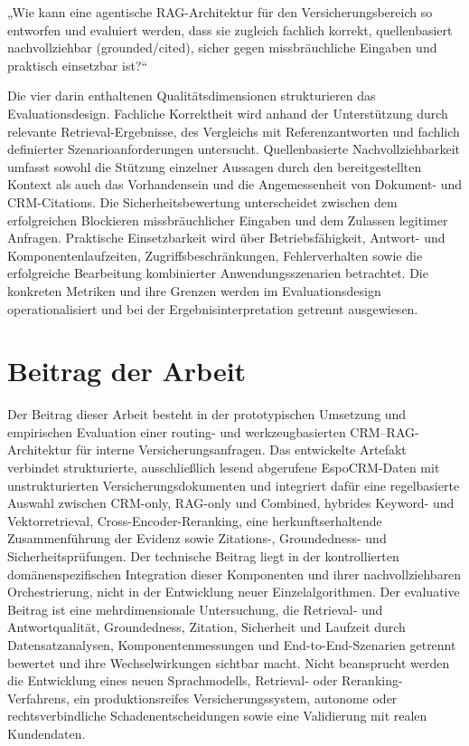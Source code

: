 „Wie kann eine agentische RAG-Architektur für den Versicherungsbereich so entworfen und evaluiert werden, dass sie zugleich fachlich korrekt, quellenbasiert nachvollziehbar (grounded/cited), sicher gegen missbräuchliche Eingaben und praktisch einsetzbar ist?“

Die vier darin enthaltenen Qualitätsdimensionen strukturieren das Evaluationsdesign. Fachliche Korrektheit wird anhand der Unterstützung durch relevante Retrieval-Ergebnisse, des Vergleichs mit Referenzantworten und fachlich definierter Szenarioanforderungen untersucht. Quellenbasierte Nachvollziehbarkeit umfasst sowohl die Stützung einzelner Aussagen durch den bereitgestellten Kontext als auch das Vorhandensein und die Angemessenheit von Dokument- und CRM-Citations. Die Sicherheitsbewertung unterscheidet zwischen dem erfolgreichen Blockieren missbräuchlicher Eingaben und dem Zulassen legitimer Anfragen. Praktische Einsetzbarkeit wird über Betriebsfähigkeit, Antwort- und Komponentenlaufzeiten, Zugriffsbeschränkungen, Fehlerverhalten sowie die erfolgreiche Bearbeitung kombinierter Anwendungsszenarien betrachtet. Die konkreten Metriken und ihre Grenzen werden im Evaluationsdesign operationalisiert und bei der Ergebnisinterpretation getrennt ausgewiesen.

\section{Beitrag der Arbeit}

Der Beitrag dieser Arbeit besteht in der prototypischen Umsetzung und empirischen Evaluation einer routing- und werkzeugbasierten CRM--RAG-Architektur für interne Versicherungsanfragen. Das entwickelte Artefakt verbindet strukturierte, ausschließlich lesend abgerufene EspoCRM-Daten mit unstrukturierten Versicherungsdokumenten und integriert dafür eine regelbasierte Auswahl zwischen CRM-only, RAG-only und Combined, hybrides Keyword- und Vektorretrieval, Cross-Encoder-Reranking, eine herkunftserhaltende Zusammenführung der Evidenz sowie Zitations-, Groundedness- und Sicherheitsprüfungen. Der technische Beitrag liegt in der kontrollierten domänenspezifischen Integration dieser Komponenten und ihrer nachvollziehbaren Orchestrierung, nicht in der Entwicklung neuer Einzelalgorithmen. Der evaluative Beitrag ist eine mehrdimensionale Untersuchung, die Retrieval- und Antwortqualität, Groundedness, Zitation, Sicherheit und Laufzeit durch Datensatzanalysen, Komponentenmessungen und End-to-End-Szenarien getrennt bewertet und ihre Wechselwirkungen sichtbar macht. Nicht beansprucht werden die Entwicklung eines neuen Sprachmodells, Retrieval- oder Reranking-Verfahrens, ein produktionsreifes Versicherungssystem, autonome oder rechtsverbindliche Schadenentscheidungen sowie eine Validierung mit realen Kundendaten.

